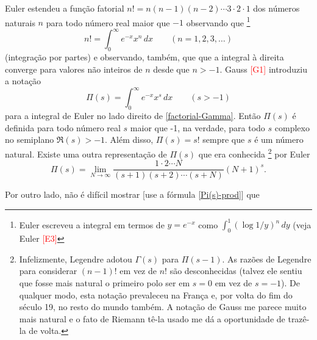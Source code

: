     
    Euler estendeu a função fatorial $n! = n(n-1)(n-2) \cdots 3 \cdot 2 \cdot 1$ dos números naturais $n$ para todo número real maior que $-1$ observando que 
    \footnote{Euler escreveu a integral em termos de $y = e^{-x}$ como $\int_{0}^{1}(\log 1/y)^n \, dy$ (veja Euler \textcolor{red}{[E3]}
    }
    \begin{equation}
        \label{factorial-Gamma}
        n! = \int_{0}^{\infty}e^{-x}x^n \, dx \qquad (n = 1, 2, 3, \dots)
    \end{equation}
    (integração por partes) e observando, também, que que a integral à direita converge para valores não inteiros de $n$ desde que $n>-1$. Gauss \textcolor{red}{[G1]} introduziu a notação
    \begin{equation}
        \label{factorial-Gamma-pi}
        \Pi(s) = \int_{0}^{\infty}e^{-x}x^s \, dx \qquad (s>-1)
    \end{equation}
    para a integral de Euler no lado direito de \eqref{factorial-Gamma}. Então $\Pi(s)$ é definida para todo número real $s$ maior que -1, na verdade, para todo $s$ complexo no semiplano $\Re(s)>-1$. Além disso, $\Pi(s) = s!$ sempre que $s$ é um número natural. Existe uma outra representação de $\Pi(s)$ que era conhecida
    \footnote{Infelizmente, Legendre adotou $\Gamma(s)$ para $\Pi(s-1)$. As razões de Legendre para considerar $(n-1)!$ em vez de $n!$ são desconhecidas (talvez ele sentiu que fosse mais natural o primeiro polo ser em $s=0$ em vez de $s=-1$). De qualquer modo, esta notação prevaleceu na França e, por volta do fim do século 19, no resto do mundo também. A notação de Gauss me parece muito mais natural e o fato de Riemann tê-la usado me dá a oportunidade de trazê-la de volta.
    }
    por Euler
    \begin{equation}
        \label{Pi(s)-lim-N}
        \Pi(s) = \lim_{N \to \infty} \frac{1 \cdot 2 \cdots N}{(s+1)(s+2)\cdots (s+N)}(N+1)^s.
    \end{equation}
    
    
    Por outro lado, não é difícil mostrar [use a fórmula \eqref{Pi(s)-prod}] que 
    
    
    













